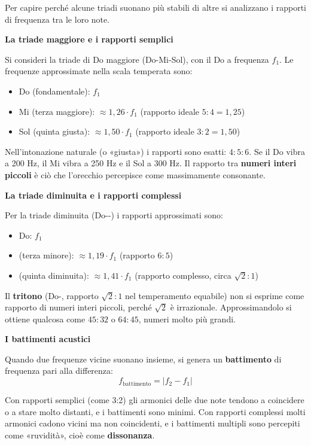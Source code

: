 \begin{fisica}
	\label{phys:rapporti_frequenza_triadi}

	Per capire perché alcune triadi suonano più stabili di altre si analizzano i rapporti di frequenza tra le loro note.

	\textbf{La triade maggiore e i rapporti semplici}

	Si consideri la triade di Do maggiore (Do-Mi-Sol), con il Do a frequenza $f_1$. Le frequenze approssimate nella scala temperata sono:
	\begin{itemize}
		\item Do (fondamentale): $f_1$
		\item Mi (terza maggiore): $\approx 1{,}26 \cdot f_1$ (rapporto ideale $5:4 = 1{,}25$)
		\item Sol (quinta giusta): $\approx 1{,}50 \cdot f_1$ (rapporto ideale $3:2 = 1{,}50$)
	\end{itemize}

	Nell'intonazione naturale (o «giusta») i rapporti sono esatti: $4:5:6$. Se il Do vibra a 200 Hz, il Mi vibra a 250 Hz e il Sol a 300 Hz. Il rapporto tra \textbf{numeri interi piccoli} è ciò che l'orecchio percepisce come massimamente consonante.

	\textbf{La triade diminuita e i rapporti complessi}

	Per la triade diminuita (Do-\Mibemolle -\Solbemolle ) i rapporti approssimati sono:
	\begin{itemize}
		\item Do: $f_1$
		\item \Mibemolle  (terza minore): $\approx 1{,}19 \cdot f_1$ (rapporto $6:5$)
		\item \Solbemolle  (quinta diminuita): $\approx 1{,}41 \cdot f_1$ (rapporto complesso, circa $\sqrt{2}:1$)
	\end{itemize}

	Il \textbf{tritono} (Do-\Solbemolle{}, rapporto $\sqrt{2}:1$ nel temperamento equabile) non si esprime come rapporto di numeri interi piccoli, perché $\sqrt{2}$ è irrazionale. Approssimandolo si ottiene qualcosa come $45:32$ o $64:45$, numeri molto più grandi.

	\textbf{I battimenti acustici}

	Quando due frequenze vicine suonano insieme, si genera un \textbf{battimento} di frequenza pari alla differenza:
	\[
	f_{\text{battimento}} = |f_2 - f_1|
	\]

	Con rapporti semplici (come 3:2) gli armonici delle due note tendono a coincidere o a stare molto distanti, e i battimenti sono minimi. Con rapporti complessi molti armonici cadono vicini ma non coincidenti, e i battimenti multipli sono percepiti come «ruvidità», cioè come \textbf{dissonanza}.


\end{fisica}
